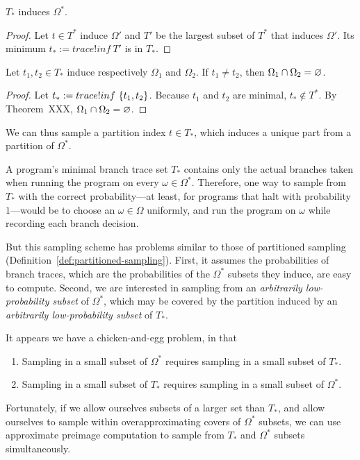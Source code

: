 \begin{theorem}
$T_*$ induces $\Omega^*$.
\end{theorem}
\begin{proof}
Let $t \in T^*$ induce $\Omega'$ and $T'$ be the largest subset of $T^*$ that induces $\Omega'$.
Its minimum $t_* := trace!inf~T'$ is in $T_*$.
\end{proof}

\begin{theorem}[$T_*$ partitions]
\label{thm:minimal-induces-partition}
Let $t_1,t_2 \in T_*$ induce respectively $\Omega_1$ and $\Omega_2$.
If $t_1 \neq t_2$, then $\Omega_1 \cap \Omega_2 = \varnothing$.
\end{theorem}
\begin{proof}
Let $t_* := trace!inf~\{{t_1,t_2}\}$.
Because $t_1$ and $t_2$ are minimal, $t_* \notin T^*$.
By Theorem~XXX, $\Omega_1 \cap \Omega_2 = \varnothing$.
\end{proof}

We can thus sample a partition index $t \in T_*$, which induces a unique part from a partition of $\Omega^*$.

A program's minimal branch trace set $T_*$ contains only the actual branches taken when running the program on every $\omega \in \Omega^*$.
Therefore, one way to sample from $T_*$ with the correct probability---at least, for programs that halt with probability $1$---would be to choose an $\omega \in \Omega$ uniformly, and run the program on $\omega$ while recording each branch decision.

But this sampling scheme has problems similar to those of partitioned sampling (Definition~\ref{def:partitioned-sampling}).
First, it assumes the probabilities of branch traces, which are the probabilities of the $\Omega^*$ subsets they induce, are easy to compute.
Second, we are interested in sampling from an \emph{arbitrarily low-probability subset} of $\Omega^*$, which may be covered by the partition induced by an \emph{arbitrarily low-probability subset} of $T_*$.

It appears we have a chicken-and-egg problem, in that
\begin{enumerate}
	\item Sampling in a small subset of $\Omega^*$ requires sampling in a small subset of $T_*$.
	\item Sampling in a small subset of $T_*$ requires sampling in a small subset of $\Omega^*$.
\end{enumerate}
Fortunately, if we allow ourselves subsets of a larger set than $T_*$, and allow ourselves to sample within overapproximating covers of $\Omega^*$ subsets, we can use approximate preimage computation to sample from $T_*$ and $\Omega^*$ subsets simultaneously.

